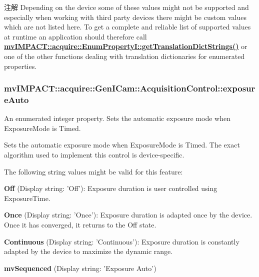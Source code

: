 \begin{DoxyNote}{注解}
Depending on the device some of these values might not be supported and especially when working with third party devices there might be custom values which are not listed here. To get a complete and reliable list of supported values at runtime an application should therefore call {\bfseries \hyperlink{classmv_i_m_p_a_c_t_1_1acquire_1_1_enum_property_i_a0ba6ccbf5ee69784d5d0b537924d26b6}{mv\+I\+M\+P\+A\+C\+T\+::acquire\+::\+Enum\+Property\+I\+::get\+Translation\+Dict\+Strings()}} or one of the other functions dealing with translation dictionaries for enumerated properties. 
\end{DoxyNote}
\hypertarget{classmv_i_m_p_a_c_t_1_1acquire_1_1_gen_i_cam_1_1_acquisition_control_a4c702e88d0591dbebff925de205138b4}{
\subsubsection[{exposure\+Auto}]{ mv\+I\+M\+P\+A\+C\+T\+::acquire\+::\+Gen\+I\+Cam\+::\+Acquisition\+Control\+::exposure\+Auto}}\label{classmv_i_m_p_a_c_t_1_1acquire_1_1_gen_i_cam_1_1_acquisition_control_a4c702e88d0591dbebff925de205138b4}


An enumerated integer property. Sets the automatic exposure mode when Exposure\+Mode is Timed. 

Sets the automatic exposure mode when Exposure\+Mode is Timed. The exact algorithm used to implement this control is device-\/specific.

The following string values might be valid for this feature\+:
\begin{DoxyItemize}
\item {\bfseries Off} (Display string\+: 'Off')\+: Exposure duration is user controlled using Exposure\+Time.
\item {\bfseries Once} (Display string\+: 'Once')\+: Exposure duration is adapted once by the device. Once it has converged, it returns to the Off state.
\item {\bfseries Continuous} (Display string\+: 'Continuous')\+: Exposure duration is constantly adapted by the device to maximize the dynamic range.
\item {\bfseries mv\+Sequenced} (Display string\+: 'Exposure Auto')
\end{DoxyItemize}

